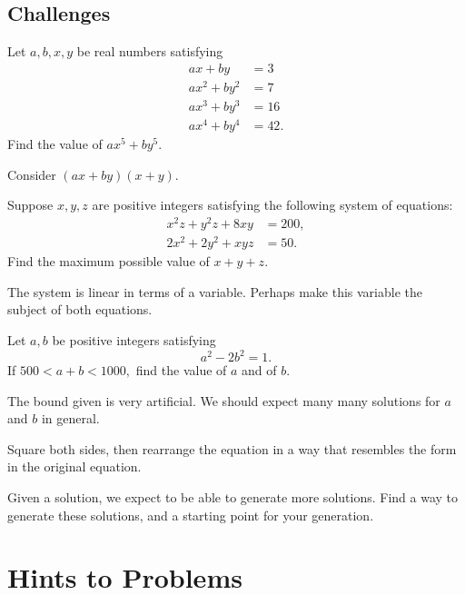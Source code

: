 \documentclass[../jarvis.tex]{subfiles}
\begin{document}
\subsection{Challenges}
\problem[1990 AIME P15]Let $a,b,x,y$ be real numbers satisfying
\begin{align*}
    ax+by&=3 \\
    ax^2+by^2&=7 \\
    ax^3+by^3&=16 \\
    ax^4+by^4&=42.
\end{align*}
Find the value of $ax^5+by^5$.
\begin{hints}
    \begin{hint}
        Consider $(ax+by)(x+y)$.
    \end{hint}
\end{hints}
\problem[2019 SMO(S) P16]Suppose $x,y,z$ are positive integers satisfying the following system of equations:
\begin{align*}
    x^2z+y^2z+8xy&=200,\\
    2x^2+2y^2+xyz&=50.
\end{align*}
Find the maximum possible value of $x+y+z$.
\begin{hints}
    \begin{hint}
        The system is linear in terms of a variable. Perhaps make this variable the subject of both equations.
    \end{hint}
\end{hints}
\problem[2019 SMO(S) P25]Let $a,b$ be positive integers satisfying
$$a^2-2b^2=1.$$
If $500<a+b<1000,$ find the value of $a$ and of $b$.
\begin{hints}
    \begin{hint}
        The bound given is very artificial. We should expect many many solutions for $a$ and $b$ in general.
    \end{hint}
    \begin{hint}
        Square both sides, then rearrange the equation in a way that resembles the form in the original equation.
    \end{hint}
    \begin{hint}
        Given a solution, we expect to be able to generate more solutions. Find a way to generate these solutions, and a starting point for your generation.
    \end{hint}
\end{hints}
\section{Hints to Problems}
\printhint
\end{document}
